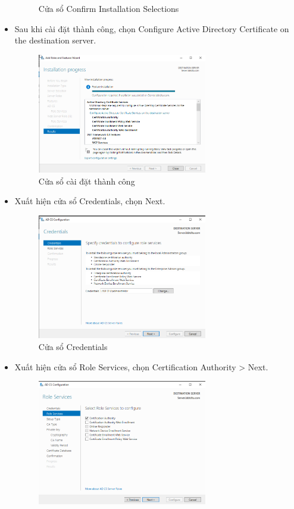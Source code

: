 \documentclass[13pt]{report}
\begin{document}
\begin{itemize}
\begin{figure}[htp]
			\caption{Cửa sổ Confirm Installation Selections}
		\end{figure}
		\newpage
		\item Sau khi cài đặt thành công, chọn Configure Active Directory Certificate on the destination server.
		\begin{figure}[htp]
			\centering
			\includegraphics[width=0.7\textwidth]{image/Gui/ADCS/13.png}
			\caption{Cửa sổ cài đặt thành công}
		\end{figure}
		\item Xuất hiện cửa sổ Credentials, chọn Next.
		\begin{figure}[htp]
			\centering
			\includegraphics[width=0.7\textwidth]{image/Gui/ADCS/14.png}
			\caption{Cửa sổ Credentials}
		\end{figure}
		\newpage
		\item Xuất hiện cửa sổ Role Services, chọn Certification Authority > Next.
		\begin{figure}[htp]
			\centering
			\includegraphics[width=0.7\textwidth]{image/Gui/ADCS/15.png}

\end{figure}
\end{itemize}
\end{document}
